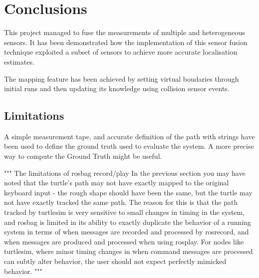\chapter{Conclusions}
\label{ch:conclusion}


\noindent
This project managed to fuse the measurements of multiple and heterogeneous sensors.
It has been demonstrated how the implementation of this sensor fusion technique exploited a subset of sensors to achieve more accurate localisation estimates.

The mapping feature has been achieved by setting virtual boudaries through initial runs and then updating its knowledge using collision sensor events.




\section{Limitations}
\noindent
A simple measurement tape, and accurate definition of the path with strings have been used to define the ground truth used to evaluate the system.
A more precise way to compute the Ground Truth might be useful.

"""
The limitations of rosbag record/play
In the previous section you may have noted that the turtle's path may not have exactly mapped
to the original keyboard input - the rough shape should have been the same, but the turtle may
not have exactly tracked the same path. The reason for this is that the path tracked by turtlesim
is very sensitive to small changes in timing in the system, and rosbag is limited in its ability to
exactly duplicate the behavior of a running system in terms of when messages are recorded and
processed by rosrecord, and when messages are produced and processed when using rosplay.
For nodes like turtlesim, where minor timing changes in when command messages are
processed can subtly alter behavior, the user should not expect perfectly mimicked behavior.
"""

